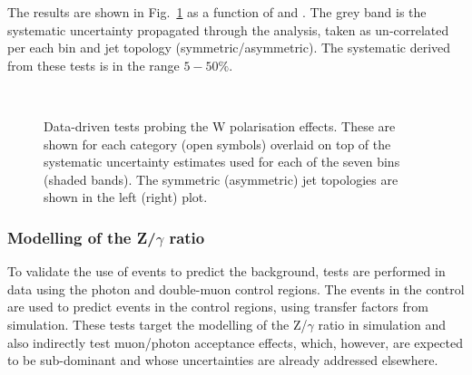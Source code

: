 The results are shown in Fig.~\ref{fig:closureMuPToMuM} as a function of \scalht and \njet. 
The grey band is the systematic uncertainty propagated through the analysis, 
taken as un-correlated per each \scalht bin and jet topology (symmetric/asymmetric). The systematic derived from these tests is
in the range $5-50\%$.



\begin{figure}[h!]
  \begin{center}
    ~~
    \caption{Data-driven tests probing the W polarisation effects. 
      These are shown for each
      \njet category (open symbols) overlaid on top of the systematic
      uncertainty estimates used for each of the seven \scalht bins
      (shaded bands). 
      The symmetric (asymmetric) jet topologies are shown in the left (right) plot.       
    }
    \label{fig:closureMuPToMuM}
  \end{center} 
\end{figure}



\subsubsection*{Modelling of the Z/$\gamma$ ratio}
\label{sec:tfSyst_ZGratio}
To validate the use of \gj events to predict the \znunu
background, tests are performed in data using the photon and double-muon control regions. 
The events in the \gj control are used to predict events in the \mmj control regions, 
using transfer factors from simulation. 
These tests target the modelling of the Z/$\gamma$ ratio in simulation and 
also indirectly test muon/photon acceptance effects, which, however, 
are expected to be sub-dominant and whose uncertainties are already addressed elsewhere. 

